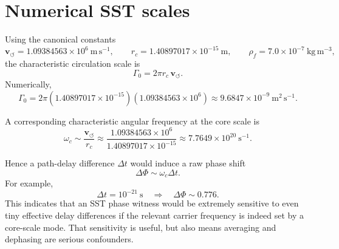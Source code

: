 \documentclass[11pt]{article}
\begin{document}
    \section{Numerical SST scales}
        
        Using the canonical constants
        \[
            \mathbf{v}_{\!\boldsymbol{\circlearrowleft}} = 1.09384563\times 10^{6}\ \mathrm{m\,s^{-1}},
            \qquad
            r_c = 1.40897017\times 10^{-15}\ \mathrm{m},
            \qquad
            \rho_{\!f}=7.0\times 10^{-7}\ \mathrm{kg\,m^{-3}},
        \]
        the characteristic circulation scale is
        \begin{equation}
            \Gamma_0 = 2\pi r_c\,\mathbf{v}_{\!\boldsymbol{\circlearrowleft}}.
            \label{eq:Gamma0}
        \end{equation}
        Numerically,
        \begin{equation}
            \Gamma_0
            =
            2\pi(1.40897017\times 10^{-15})(1.09384563\times 10^6)
            \approx 9.6847\times 10^{-9}\ \mathrm{m^2\,s^{-1}}.
            \label{eq:Gamma0num}
        \end{equation}
        
        A corresponding characteristic angular frequency at the core scale is
        \begin{equation}
            \omega_c \sim \frac{\mathbf{v}_{\!\boldsymbol{\circlearrowleft}}}{r_c}
            \approx
            \frac{1.09384563\times 10^6}{1.40897017\times 10^{-15}}
            \approx 7.7649\times 10^{20}\ \mathrm{s^{-1}}.
            \label{eq:omegac}
        \end{equation}
        
        Hence a path-delay difference \(\Delta t\) would induce a raw phase shift
        \begin{equation}
            \Delta \Phi \sim \omega_c \Delta t.
            \label{eq:dphi_dt}
        \end{equation}
        For example,
        \begin{equation}
            \Delta t = 10^{-21}\ \mathrm{s}
            \quad\Longrightarrow\quad
            \Delta \Phi \sim 0.776.
            \label{eq:dphi_example}
        \end{equation}
        This indicates that an SST phase witness would be extremely sensitive to even tiny effective delay differences if the relevant carrier frequency is indeed set by a core-scale mode. That sensitivity is useful, but also means averaging and dephasing are serious confounders.
    
\end{document}
